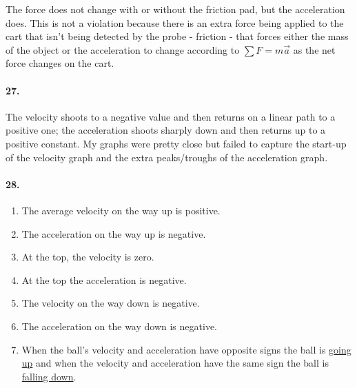     \begin{mdframed}
        The force does not change with or without the friction pad, but the acceleration does. This is not a violation because there is an extra force being applied to the cart that isn't being detected by the probe - friction - that forces either the mass of the object or the acceleration to change according to $\sum F = m\vec{a}$ as the net force changes on the cart.
    \end{mdframed}

    \paragraph*{27.}

    \begin{mdframed}
        The velocity shoots to a negative value and then returns on a linear path to a positive one; the acceleration shoots sharply down and then returns up to a positive constant. My graphs were pretty close but failed to capture the start-up of the velocity graph and the extra peaks/troughs of the acceleration graph.
    \end{mdframed}

    \paragraph*{28.}

    \begin{mdframed}
        \begin{enumerate}[label=\Alph*.]
            \item The average velocity on the way up is positive.
            \item The acceleration on the way up is negative.
            \item At the top, the velocity is zero.
            \item At the top the acceleration is negative.
            \item The velocity on the way down is negative.
            \item The acceleration on the way down is negative.
            \item When the ball's velocity and acceleration have opposite signs the ball is \underline{going up} and when the velocity and acceleration have the same sign the ball is \underline{falling down}.
        \end{enumerate}
    \end{mdframed}

